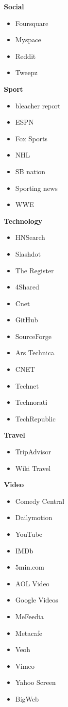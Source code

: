 \textbf{Social}
\begin{itemize}
\item	Foursquare	
\item	Myspace	
\item	Reddit	
\item	Tweepz	
\end{itemize}
\textbf{Sport}
\begin{itemize}
\item	bleacher report	
\item	ESPN	
\item	Fox Sports	
\item	NHL	
\item	SB nation	
\item	Sporting news	
\item	WWE	
\end{itemize}
\textbf{Technology}
\begin{itemize}
\item	HNSearch	
\item	Slashdot	
\item	The Register	
\item	4Shared	
\item	Cnet	
\item	GitHub	
\item	SourceForge	
\item	Ars Technica	
\item	CNET	
\item	Technet	
\item	Technorati	
\item	TechRepublic	
\end{itemize}
\textbf{Travel}
\begin{itemize}
\item	TripAdvisor	
\item	Wiki Travel	
\end{itemize}
\textbf{Video}
\begin{itemize}
\item	Comedy Central	
\item	Dailymotion	
\item	YouTube	
\item	IMDb	
\item	5min.com	
\item	AOL Video	
\item	Google Videos	
\item	MeFeedia	
\item	Metacafe	
\item	Veoh	
\item	Vimeo	
\item	Yahoo Screen	
\item	BigWeb	
\end{itemize}
